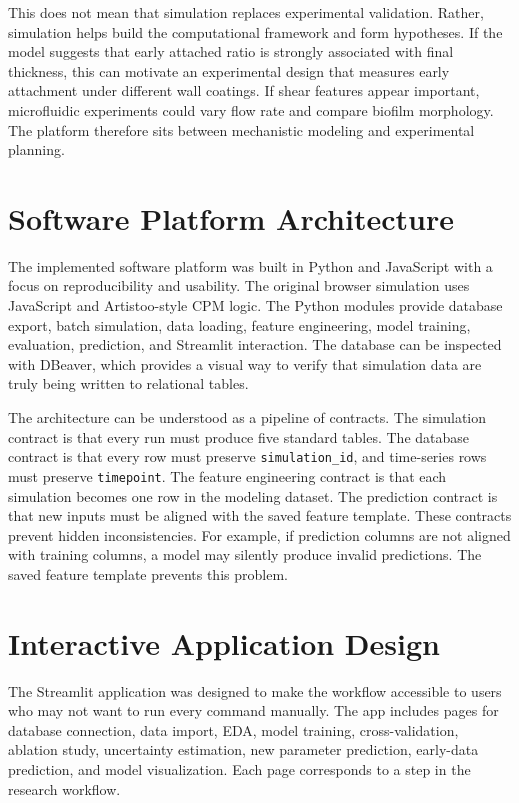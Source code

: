 \documentclass[12pt,a4paper,oneside]{report}
\begin{document}
This does not mean that simulation replaces experimental validation. Rather, simulation helps build the computational framework and form hypotheses. If the model suggests that early attached ratio is strongly associated with final thickness, this can motivate an experimental design that measures early attachment under different wall coatings. If shear features appear important, microfluidic experiments could vary flow rate and compare biofilm morphology. The platform therefore sits between mechanistic modeling and experimental planning.


\section{Software Platform Architecture}
The implemented software platform was built in Python and JavaScript with a focus on reproducibility and usability. The original browser simulation uses JavaScript and Artistoo-style CPM logic. The Python modules provide database export, batch simulation, data loading, feature engineering, model training, evaluation, prediction, and Streamlit interaction. The database can be inspected with DBeaver, which provides a visual way to verify that simulation data are truly being written to relational tables.

The architecture can be understood as a pipeline of contracts. The simulation contract is that every run must produce five standard tables. The database contract is that every row must preserve \texttt{simulation\_id}, and time-series rows must preserve \texttt{timepoint}. The feature engineering contract is that each simulation becomes one row in the modeling dataset. The prediction contract is that new inputs must be aligned with the saved feature template. These contracts prevent hidden inconsistencies. For example, if prediction columns are not aligned with training columns, a model may silently produce invalid predictions. The saved feature template prevents this problem.

\section{Interactive Application Design}
The Streamlit application was designed to make the workflow accessible to users who may not want to run every command manually. The app includes pages for database connection, data import, EDA, model training, cross-validation, ablation study, uncertainty estimation, new parameter prediction, early-data prediction, and model visualization. Each page corresponds to a step in the research workflow.
\end{document}
